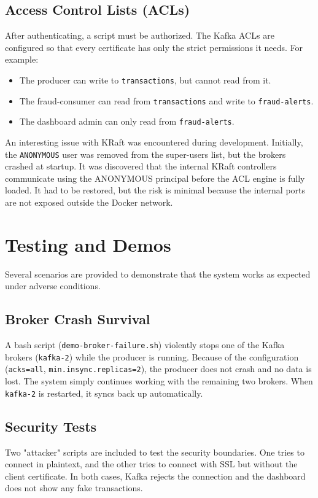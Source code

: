 \documentclass[11pt,a4paper]{article}
\begin{document}
\subsection{Access Control Lists (ACLs)}
After authenticating, a script must be authorized. The Kafka ACLs are configured so that every certificate has only the strict permissions it needs. For example:
\begin{itemize}
    \item The producer can write to \texttt{transactions}, but cannot read from it.
    \item The fraud-consumer can read from \texttt{transactions} and write to \texttt{fraud-alerts}.
    \item The dashboard admin can only read from \texttt{fraud-alerts}.
\end{itemize}

An interesting issue with KRaft was encountered during development. Initially, the \texttt{ANONYMOUS} user was removed from the super-users list, but the brokers crashed at startup. It was discovered that the internal KRaft controllers communicate using the ANONYMOUS principal before the ACL engine is fully loaded. It had to be restored, but the risk is minimal because the internal ports are not exposed outside the Docker network.

\section{Testing and Demos}
Several scenarios are provided to demonstrate that the system works as expected under adverse conditions.

\subsection{Broker Crash Survival}
A bash script (\texttt{demo-broker-failure.sh}) violently stops one of the Kafka brokers (\texttt{kafka-2}) while the producer is running. Because of the configuration (\texttt{acks=all}, \texttt{min.insync.replicas=2}), the producer does not crash and no data is lost. The system simply continues working with the remaining two brokers. When \texttt{kafka-2} is restarted, it syncs back up automatically.

\subsection{Security Tests}
Two "attacker" scripts are included to test the security boundaries. One tries to connect in plaintext, and the other tries to connect with SSL but without the client certificate. In both cases, Kafka rejects the connection and the dashboard does not show any fake transactions.
\end{document}
